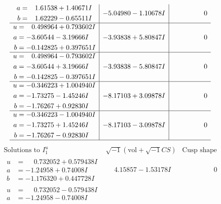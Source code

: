 \documentclass[1p]{elsarticle_modified}
\theoremstyle{definition}
\newcommand{\I}{\sqrt{-1}}
\begin{document}
$$\begin{array}{c|c|c}
\begin{aligned}
a &= \phantom{-}1.61538 + 1.40671 I \\
b &= \phantom{-}1.62229 - 0.65511 I\end{aligned}
 & -5.04980 - 1.10678 I & \phantom{-0.000000 } 0 \\ \hline\begin{aligned}
u &= \phantom{-}0.498964 + 0.793602 I \\
a &= -3.60544 - 3.19666 I \\
b &= -0.142825 + 0.397651 I\end{aligned}
 & -3.93838 + 5.80847 I & \phantom{-0.000000 } 0 \\ \hline\begin{aligned}
u &= \phantom{-}0.498964 - 0.793602 I \\
a &= -3.60544 + 3.19666 I \\
b &= -0.142825 - 0.397651 I\end{aligned}
 & -3.93838 - 5.80847 I & \phantom{-0.000000 } 0 \\ \hline\begin{aligned}
u &= -0.346223 + 1.004940 I \\
a &= -1.73275 - 1.45246 I \\
b &= -1.76267 + 0.92830 I\end{aligned}
 & -8.17103 + 3.09878 I & \phantom{-0.000000 } 0 \\ \hline\begin{aligned}
u &= -0.346223 - 1.004940 I \\
a &= -1.73275 + 1.45246 I \\
b &= -1.76267 - 0.92830 I\end{aligned}
 & -8.17103 - 3.09878 I & \phantom{-0.000000 } 0\\
 \hline 
 \end{array}$$\newpage$$\begin{array}{c|c|c}  
\text{Solutions to }I^u_{1}& \I (\text{vol} + \sqrt{-1}CS) & \text{Cusp shape}\\
 \hline 
\begin{aligned}
u &= \phantom{-}0.732052 + 0.579438 I \\
a &= -1.24958 + 0.74008 I \\
b &= -1.176320 + 0.447728 I\end{aligned}
 & \phantom{-}4.15857 - 1.53178 I & \phantom{-0.000000 } 0 \\ \hline\begin{aligned}
u &= \phantom{-}0.732052 - 0.579438 I \\
a &= -1.24958 - 0.74008 I \\

\end{aligned}
\end{array}$$
\end{document}
